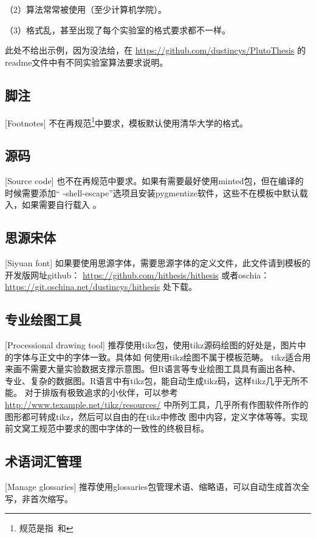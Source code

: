 （2）算法常常被使用（至少计算机学院）。

（3）格式乱，甚至出现了每个实验室的格式要求都不一样。

此处不给出示例，因为没法给，在
\href{https://github.com/dustincys/PlutoThesis}{https://github.com/dustincys/PlutoThesis}
的readme文件中有不同实验室算法要求说明。

\subsection{脚注}[Footnotes]
不在再规范\footnote{规范是指\PGR\ 和\UGR}中要求，模板默认使用清华大学的格式。

\subsection{源码}[Source code]
也不在再规范中要求。如果有需要最好使用minted包，但在编译的时候需要添加“
-shell-escape”选项且安装pygmentize软件，这些不在模板中默认载入，如果需要自行载入
。
\subsection{思源宋体}[Siyuan font]
如果要使用思源字体，需要思源字体的定义文件，此文件请到模板的开发版网址github：
\href{https://github.com/hithesis/hithesis}{https://github.com/hithesis/hithesis}
或者oschia：
\href{https://git.oschina.net/dustincys/hithesis}{https://git.oschina.net/dustincys/hithesis}
处下载。

\subsection{专业绘图工具}[Processional drawing tool]
\label{drawtool}
推荐使用tikz包，使用tikz源码绘图的好处是，图片中的字体与正文中的字体一致。具体如
何使用tikz绘图不属于模板范畴。
tikz适合用来画不需要大量实验数据支撑示意图。但R语言等专业绘图工具具有画出各种、
专业、复杂的数据图。R语言中有tikz包，能自动生成tikz码，这样tikz几乎无所不能。
对于排版有极致追求的小伙伴，可以参考
\href{http://www.texample.net/tikz/resources/}{http://www.texample.net/tikz/resources/}
中所列工具，几乎所有作图软件所作的图形都可转成tikz，然后可以自由的在tikz中修改
图中内容，定义字体等等。实现前文窝工规范中要求的图中字体的一致性的终极目标。


\subsection{术语词汇管理}[Manage glossaries]
推荐使用glossaries包管理术语、缩略语，可以自动生成首次全写，非首次缩写。

